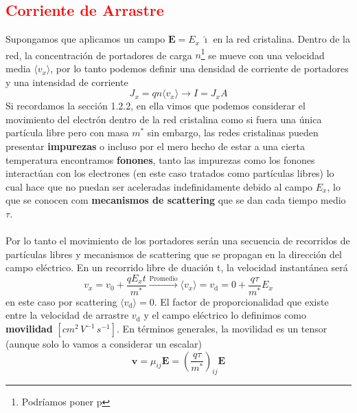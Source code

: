 \subsection{\textcolor{red}{Corriente de Arrastre}} \label{sec: Corriente de arrastre}
Supongamos que aplicamos un campo $\mathbf{E}=E_x \ \mathbf{\hat{\imath}}$ en la red cristalina. Dentro de la red, la concentración de portadores de carga $n$\footnote{Podríamos poner p} se mueve con una velocidad media $\langle v_x \rangle$, por lo tanto podemos definir una densidad de corriente de portadores y una intensidad de corriente
\begin{equation}
    J_x=qn\langle v_x \rangle \rightarrow{} I=J_xA
    \label{eq: Densidad de corriente de portadores}
\end{equation}
Si recordamos la sección 1.2.2, en ella vimos que podemos considerar el movimiento del electrón dentro de la red cristalina como si fuera una única partícula libre pero con masa $m^*$ sin embargo, las redes cristalinas pueden presentar \textbf{impurezas} o incluso por el mero hecho de estar a una cierta temperatura encontramos \textbf{fonones}, tanto las impurezas como los fonones interactúan con los electrones (en este caso tratados como partículas libres) lo cual hace que no puedan ser aceleradas indefinidamente debido al campo $E_x$, lo que se conocen com \textbf{mecanismos de scattering} que se dan cada tiempo medio $\tau$.\\\\
Por lo tanto el movimiento de los portadores serán una secuencia de recorridos de partículas libres y mecanismos de scattering que se propagan en la dirección del campo eléctrico.
\newpage
En un recorrido libre de duación t, la velocidad instantánea será 
\begin{equation}
    v_x=v_0+\frac{qE_xt}{m^*} \xrightarrow{\text{Promedio}} \langle v_x\rangle=v_\mathrm{d}=0+\frac{q \tau}{m^*} E_x  
    \label{eq: Velocidad de desplazamiento}
\end{equation}
en este caso por scattering $\langle v_\mathrm{d} \rangle=0$. El factor de proporcionalidad que existe entre la velocidad de arrastre $v_\mathrm{d}$ y el campo eléctrico lo definimos como \textbf{movilidad} $\unit{[cm^2 \, V^{-1} \, s^{-1}]}$. En términos generales, la movilidad es un tensor (aunque solo lo vamos a considerar un escalar)
\begin{equation}
   \mathbf{v}=\mu_{ij} \mathbf{E}=\left (\frac{q\tau}{m^*}\right)_ {ij} \mathbf{E}
    \label{eq: movilidad tensor}
\end{equation}
